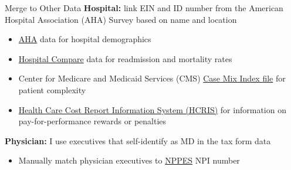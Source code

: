 \documentclass[notes,11pt, aspectratio=169]{beamer}
\begin{document}
\begin{frame}{Merge to Other Data}
    \textbf{Hospital:} link EIN and ID number from the American Hospital Association (AHA) Survey based on name and location

    \vspace{1mm}
    \begin{itemize}
        \item \underline{AHA} data for hospital demographics
        \item \underline{Hospital Compare} data for readmission and mortality rates
        \item Center for Medicare and Medicaid Services (CMS) \underline{Case Mix Index file} for patient complexity
        \item \underline{Health Care Cost Report Information System (HCRIS)} for information on pay-for-performance rewards or penalties
    \end{itemize}

    \vspace{7mm}

    \textbf{Physician:} I use executives that self-identify as MD in the tax form data

    \vspace{1mm}

    \begin{itemize}
        \item Manually match physician executives to \underline{NPPES} NPI number
    \end{itemize}
\end{frame}
\end{document}
